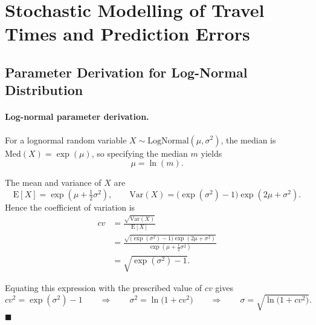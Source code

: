 \documentclass[a4paper,fleqn]{cas-sc}
\begin{document}
\section{Stochastic Modelling of Travel Times and Prediction Errors}

\subsection{Parameter Derivation for Log-Normal Distribution}\label{Appendix:log_normal}

\paragraph{Log-normal parameter derivation.}
For a lognormal random variable $X \sim \mathrm{LogNormal}(\mu,\sigma^{2})$,  
the median is $\mathrm{Med}(X)=\exp(\mu)$, so specifying the median $m$ yields
\[
\mu = \ln(m).
\]

The mean and variance of $X$ are
\[
\mathrm{E}[X] = \exp\!\left(\mu + \tfrac{1}{2}\sigma^{2}\right),
\qquad
\mathrm{Var}(X) = \bigl(\exp(\sigma^{2}) - 1\bigr)\exp\!\left(2\mu + \sigma^{2}\right).
\]
Hence the coefficient of variation is
\[
\begin{aligned}
cv
&= \frac{\sqrt{\mathrm{Var}(X)}}{\mathrm{E}[X]} \\
&= \frac{\sqrt{\bigl(\exp(\sigma^{2}) - 1\bigr)\exp(2\mu + \sigma^{2})}}
        {\exp(\mu + \tfrac{1}{2}\sigma^{2})} \\
&= \sqrt{\exp(\sigma^{2}) - 1}.
\end{aligned}
\]

Equating this expression with the prescribed value of $cv$ gives
\[
cv^{2} = \exp(\sigma^{2}) - 1
\qquad\Longrightarrow\qquad
\sigma^{2} = \ln\!\bigl(1 + cv^{2}\bigr)
\qquad\Longrightarrow\qquad
\sigma = \sqrt{\ln\!\bigl(1 + cv^{2}\bigr)}.
\]
\hfill$\blacksquare$



\end{document}
